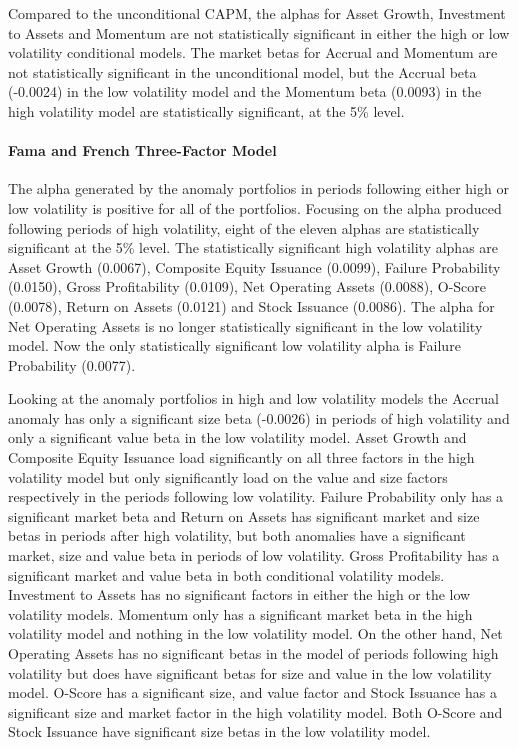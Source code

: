 \documentclass[12pt, a4paper, oneside]{article}
\begin{document}
Compared to the unconditional CAPM, the alphas for Asset Growth, Investment to Assets and Momentum are not statistically significant in either the high or low volatility conditional models. The market betas for Accrual and Momentum are not statistically significant in the unconditional model, but the Accrual beta (-0.0024) in the low volatility model and the Momentum beta (0.0093) in the high volatility model are statistically significant, at the 5\% level. 

\paragraph{Fama and French Three-Factor Model}
The alpha generated by the anomaly portfolios in periods following either high or low volatility is positive for all of the portfolios. Focusing on the alpha produced following periods of high volatility, eight of the eleven alphas are statistically significant at the 5\% level. The statistically significant high volatility alphas are Asset Growth (0.0067), Composite Equity Issuance (0.0099), Failure Probability (0.0150), Gross Profitability (0.0109), Net Operating Assets (0.0088), O-Score (0.0078), Return on Assets (0.0121) and Stock Issuance (0.0086). The alpha for Net Operating Assets is no longer statistically significant in the low volatility model. Now the only statistically significant low volatility alpha is Failure Probability (0.0077). 

Looking at the anomaly portfolios in high and low volatility models the Accrual anomaly has only a significant size beta (-0.0026) in periods of high volatility and only a significant value beta in the low volatility model. Asset Growth and Composite Equity Issuance load significantly on all three factors in the high volatility model but only significantly load on the value and size factors respectively in the periods following low volatility. Failure Probability only has a significant market beta and Return on Assets has significant market and size betas in periods after high volatility, but both anomalies have a significant market, size and value beta in periods of low volatility. Gross Profitability has a significant market and value beta in both conditional volatility models. Investment to Assets has no significant factors in either the high or the low volatility models. Momentum only has a significant market beta in the high volatility model and nothing in the low volatility model. On the other hand, Net Operating Assets has no significant betas in the model of periods following high volatility but does have significant betas for size and value in the low volatility model. O-Score has a significant size, and value factor and Stock Issuance has a significant size and market factor in the high volatility model. Both O-Score and Stock Issuance have significant size betas in the low volatility model.
\end{document}
